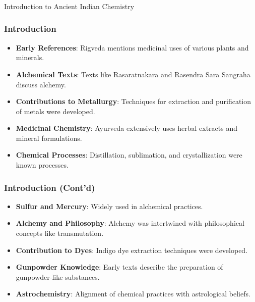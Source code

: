 \begin{frame}[fragile]\frametitle{}
\begin{center}
{\Large Introduction to Ancient Indian Chemistry}
\end{center}
\end{frame}

\begin{frame}[fragile]\frametitle{Introduction}
    
    \begin{itemize}
        \item \textbf{Early References}: Rigveda mentions medicinal uses of various plants and minerals.
        \item \textbf{Alchemical Texts}: Texts like Rasaratnakara and Rasendra Sara Sangraha discuss alchemy.
        \item \textbf{Contributions to Metallurgy}: Techniques for extraction and purification of metals were developed.
        \item \textbf{Medicinal Chemistry}: Ayurveda extensively uses herbal extracts and mineral formulations.
        \item \textbf{Chemical Processes}: Distillation, sublimation, and crystallization were known processes.
    \end{itemize}
\end{frame}

\begin{frame}
    \frametitle{Introduction (Cont'd)}
    
    \begin{itemize}
        \item \textbf{Sulfur and Mercury}: Widely used in alchemical practices.
        \item \textbf{Alchemy and Philosophy}: Alchemy was intertwined with philosophical concepts like transmutation.
        \item \textbf{Contribution to Dyes}: Indigo dye extraction techniques were developed.
        \item \textbf{Gunpowder Knowledge}: Early texts describe the preparation of gunpowder-like substances.
        \item \textbf{Astrochemistry}: Alignment of chemical practices with astrological beliefs.
    \end{itemize}
\end{frame}


